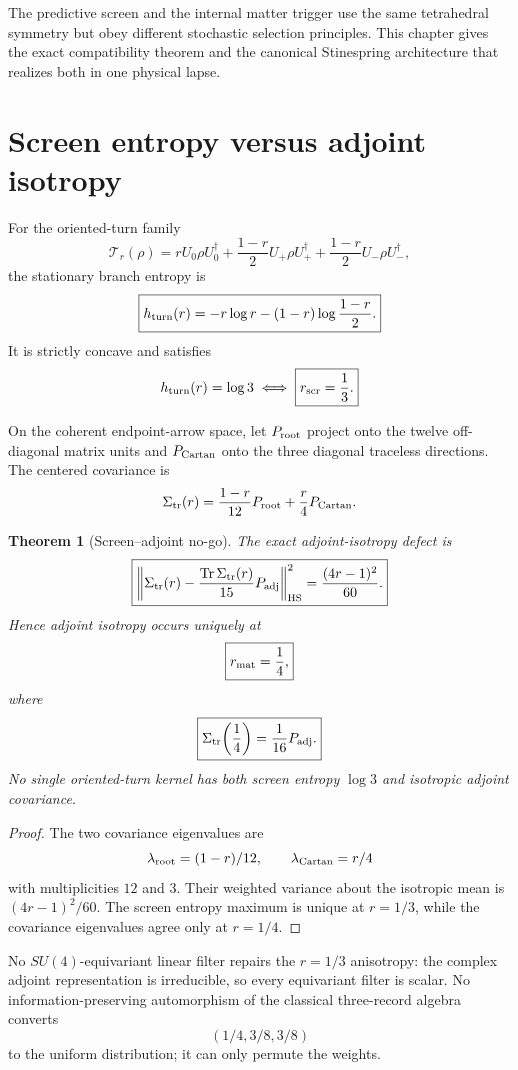 \documentclass[11pt,oneside,openany]{book}
\numberwithin{equation}{chapter}
\newtheorem{theorem}{Theorem}[chapter]
\theoremstyle{definition}
\theoremstyle{remark}
\newcommand{\Tr}{\operatorname{Tr}}
\begin{document}
The predictive screen and the internal matter trigger use the same
tetrahedral symmetry but obey different stochastic selection principles.
This chapter gives the exact compatibility theorem and the canonical
Stinespring architecture that realizes both in one physical lapse.

\section{Screen entropy versus adjoint isotropy}

For the oriented-turn family
\[
 \mathcal T_r(\rho)
 =
 rU_0\rho U_0^\dagger
 +
 \frac{1-r}{2}U_+\rho U_+^\dagger
 +
 \frac{1-r}{2}U_-\rho U_-^\dagger,
\]
the stationary branch entropy is
\[
 \boxed{
 h_{\rm turn}(r)
 =
 -r\log r-(1-r)\log\frac{1-r}{2}.}
\]
It is strictly concave and satisfies
\[
 h_{\rm turn}(r)=\log3
 \iff
 \boxed{r_{\rm scr}=\frac13.}
\]

On the coherent endpoint-arrow space, let \(P_{\rm root}\) project onto the
twelve off-diagonal matrix units and \(P_{\rm Cartan}\) onto the three
diagonal traceless directions.  The centered covariance is
\[
 \Sigma_{\rm tr}(r)
 =
 \frac{1-r}{12}P_{\rm root}
 +
 \frac r4P_{\rm Cartan}.
\]

\begin{theorem}[Screen--adjoint no-go]
\label{thm:screen-adjoint-nogo}
The exact adjoint-isotropy defect is
\[
 \boxed{
 \left\|
 \Sigma_{\rm tr}(r)
 -
 \frac{\Tr\Sigma_{\rm tr}(r)}{15}P_{\rm adj}
 \right\|_{\rm HS}^2
 =
 \frac{(4r-1)^2}{60}.}
\]
Hence adjoint isotropy occurs uniquely at
\[
 \boxed{r_{\rm mat}=\frac14,}
\]
where
\[
 \boxed{
 \Sigma_{\rm tr}\!\left(\frac14\right)
 =
 \frac1{16}P_{\rm adj}.}
\]
No single oriented-turn kernel has both screen entropy \(\log3\) and isotropic
adjoint covariance.
\end{theorem}

\begin{proof}
The two covariance eigenvalues are
\[
 \lambda_{\rm root}=(1-r)/12,
 \qquad
 \lambda_{\rm Cartan}=r/4
\]
with multiplicities \(12\) and \(3\).  Their weighted variance about the
isotropic mean is \((4r-1)^2/60\).  The screen entropy maximum is unique at
\(r=1/3\), while the covariance eigenvalues agree only at \(r=1/4\).
\end{proof}

No \(SU(4)\)-equivariant linear filter repairs the \(r=1/3\) anisotropy:
the complex adjoint representation is irreducible, so every equivariant
filter is scalar.  No information-preserving automorphism of the classical
three-record algebra converts
\[
 (1/4,3/8,3/8)
\]
to the uniform distribution; it can only permute the weights.
\end{document}
